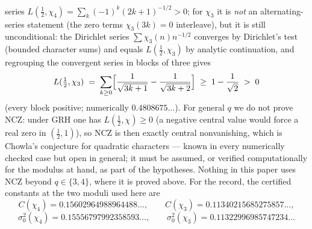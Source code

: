 series $L(\tfrac12,\chi_4)=\sum_k(-1)^k(2k+1)^{-1/2}>0$; for $\chi_3$
it is \emph{not} an alternating-series statement (the zero terms
$\chi_3(3k)=0$ interleave), but it is still unconditional: the
Dirichlet series $\sum\chi_3(n)n^{-1/2}$ converges by Dirichlet's test
(bounded character sums) and equals $L(\tfrac12,\chi_3)$ by analytic
continuation, and regrouping the convergent series in blocks of three
gives
\[
L(\tfrac12,\chi_3)\;=\;\sum_{k\ge0}
\Bigl[\frac1{\sqrt{3k+1}}-\frac1{\sqrt{3k+2}}\Bigr]
\;\ge\;1-\frac1{\sqrt2}\;>\;0
\]
(every block positive; numerically $0.4808675\ldots$). For general
$q$ we do not prove NCZ: under GRH one has $L(\tfrac12,\chi)\ge0$
(a negative central value would force a real zero in $(\tfrac12,1)$),
so NCZ is then exactly central nonvanishing, which is Chowla's
conjecture for quadratic characters --- known in every numerically
checked case but open in general; it must be assumed, or verified
computationally for the modulus at hand, as part of the hypotheses.
Nothing in this paper uses NCZ beyond $q\in\{3,4\}$, where it is proved
above. For the record, the certified constants at the two moduli used
here are
\[
C(\chi_4)=0.15602964988964488\ldots,\qquad
C(\chi_3)=0.11340215685275857\ldots,
\]
\[
\sigma_0^2(\chi_4)=0.15556797992358593\ldots,\qquad
\sigma_0^2(\chi_3)=0.11322996985747234\ldots
\]

%
%
%
